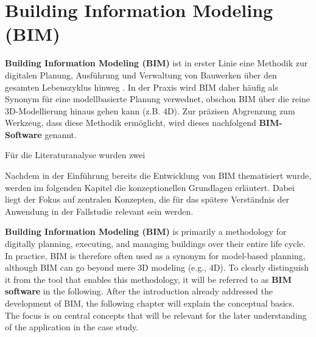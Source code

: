 \section{Building Information Modeling (BIM)}
\begin{German}
    \textbf{Building Information Modeling (BIM)} ist in erster Linie eine Methodik zur digitalen Planung, Ausführung und Verwaltung von Bauwerken über den gesamten Lebenszyklus hinweg \cite{astourLehrbuchGrundlagenBIMArbeitsmethode2022}. In der Praxis wird BIM daher häufig als Synonym für eine modellbasierte Planung verwednet, obschon BIM über die reine 3D-Modellierung hinaus gehen kann (z.B. 4D). Zur präzisen Abgrenzung zum Werkzeug, dass diese Methodik ermöglicht, wird dieses nachfolgend \textbf{BIM-Software} genannt.

    Für die Literaturanalyse wurden zwei 


    Nachdem in der Einführung bereits die Entwicklung von BIM thematisiert wurde, werden im folgenden Kapitel die konzeptionellen Grundlagen erläutert. Dabei liegt der Fokus auf zentralen Konzepten, die für das spätere Verständnis der Anwendung in der Fallstudie relevant sein werden.
\end{German}

\begin{English}
    \textbf{Building Information Modeling (BIM)} is primarily a methodology for digitally planning, executing, and managing buildings over their entire life cycle. In practice, BIM is therefore often used as a synonym for model-based planning, although BIM can go beyond mere 3D modeling (e.g., 4D). To clearly distinguish it from the tool that enables this methodology, it will be referred to as \textbf{BIM software} in the following. 
    After the introduction already addressed the development of BIM, the following chapter will explain the conceptual basics. The focus is on central concepts that will be relevant for the later understanding of the application in the case study.
\end{English}

